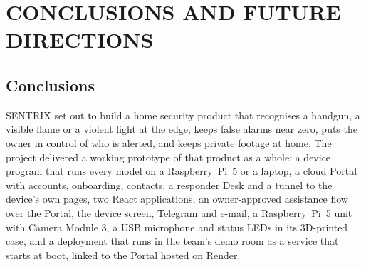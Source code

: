 \chapter{CONCLUSIONS AND FUTURE DIRECTIONS}
\label{ch:conclusions}

\section{Conclusions}
SENTRIX set out to build a home security product that recognises a handgun, a visible flame or a violent fight at the edge, keeps false alarms near zero, puts the owner in control of who is alerted, and keeps private footage at home. The project delivered a working prototype of that product as a whole: a device program that runs every model on a Raspberry~Pi~5 or a laptop, a cloud Portal with accounts, onboarding, contacts, a responder Desk and a tunnel to the device's own pages, two React applications, an owner-approved assistance flow over the Portal, the device screen, Telegram and e-mail, a Raspberry~Pi~5 unit with Camera Module 3, a USB microphone and status LEDs in its 3D-printed case, and a deployment that runs in the team's demo room as a service that starts at boot, linked to the Portal hosted on Render.

